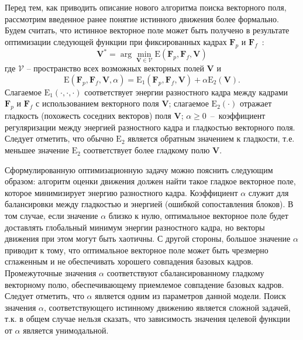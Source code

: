 Перед тем, как приводить описание нового алгоритма поиска векторного поля, рассмотрим введенное ранее понятие истинного движения более формально. Будем считать, что истинное векторное поле может быть получено в результате оптимизации следующей функции при фиксированных кадрах $\mathbf{F}_p$ и $\mathbf{F}_f$~\cite{Rajala1992}:
\begin{equation}
\mathbf{V}^* = \arg\min\limits_{\mathbf{V} \in \mathcal{V}} \mathrm{E}(\mathbf{F}_p, \mathbf{F}_f, \mathbf{V})
\label{eq:MeModel}
\end{equation}
где $\mathcal{V}$ – пространство всех возможных векторных полей $\mathbf{V}$ и
\begin{equation}
\mathrm{E}(\mathbf{F}_p, \mathbf{F}_f, \mathbf{V}, \alpha) = \mathrm{E}_1(\mathbf{F}_p, \mathbf{F}_f, \mathbf{V}) + \alpha \mathrm{E}_2(\mathbf{V}).
\label{eq:MeModelExplained}
\end{equation}
Слагаемое $\mathrm{E}_1(\cdot,\cdot,\cdot)$ соответствует энергии разностного кадра между кадрами $\mathbf{F}_p$ и $\mathbf{F}_f$ с использованием векторного поля $\mathbf{V}$; слагаемое $\mathrm{E}_2(\cdot)$ отражает гладкость (похожесть соседних векторов) поля $\mathbf{V}$; $\alpha\geq0$~--~коэффициент регуляризации между энергией разностного кадра и гладкостью векторного поля. Следует отметить, что обычно $\mathrm{E}_2$ является обратным значением к гладкости, т.е. меньшее значение $\mathrm{E}_2$ соответствует более гладкому полю $\mathbf{V}$.

Сформулированную оптимизационную задачу можно пояснить следующим образом: алгоритм оценки движения должен найти такое гладкое векторное поле, которое минимизирует энергию разностного кадра. Коэффициент $\alpha$ служит для балансировки между гладкостью и энергией (ошибкой сопоставления блоков). В том случае, если значение $\alpha$ близко к нулю, оптимальное векторное поле будет доставлять глобальный минимум энергии разностного кадра, но векторы движения при этом могут быть хаотичны. С другой стороны, большое значение $\alpha$ приводит к тому, что оптимальное векторное поле может быть чрезмерно сглаженным и не обеспечивать хорошего совпадения базовых кадров. Промежуточные значения $\alpha$ соответствуют сбалансированному гладкому векторному полю, обеспечивающему приемлемое совпадение базовых кадров. Следует отметить, что $\alpha$ является одним из параметров данной модели. Поиск значения $\alpha$, соответствующего истинному движению является сложной задачей, т.к. в общем случае нельзя сказать, что зависимость значения целевой функции от $\alpha$ является унимодальной.

